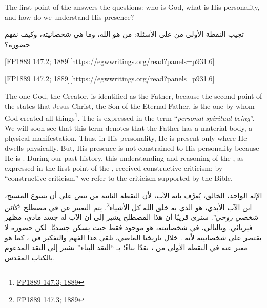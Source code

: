 



The first point of the  answers the questions: who is God, what is His personality, and how do we understand His presence?


تجيب النقطة الأولى من  على الأسئلة: من هو الله، وما هي شخصانيته، وكيف نفهم حضوره؟


[FP1889 147.2; 1889][https://egwwritings.org/read?panels=p931.6]


[FP1889 147.2; 1889][https://egwwritings.org/read?panels=p931.6]


The one God, the Creator, is identified as the Father, because the second point of the  states that Jesus Christ, the Son of the Eternal Father, is the one by whom God created all things\footnote{\href{https://egwwritings.org/?ref=en_FP1889.147.3&para=931.7}{FP1889 147.3; 1889}}. The  is expressed in the term “\textit{personal spiritual being}”. We will soon see that this term denotes that the Father has a material body, a physical manifestation. Thus, in His personality, He is present only where He dwells physically. But, His presence is not constrained to His personality because He is . During our past history, this understanding and reasoning of the , as expressed in the first point of the , received constructive criticism; by “constructive criticism” we refer to the criticism supported by the Bible.


الإله الواحد، الخالق، يُعرَّف بأنه الآب، لأن النقطة الثانية من  تنص على أن يسوع المسيح، ابن الآب الأبدي، هو الذي به خلق الله كل الأشياء\footnote{\href{https://egwwritings.org/?ref=en_FP1889.147.3&para=931.7}{FP1889 147.3; 1889}}. يتم التعبير عن  في مصطلح “\textit{كائن شخصي روحي}”. سنرى قريبًا أن هذا المصطلح يشير إلى أن الآب له جسد مادي، مظهر فيزيائي. وبالتالي، في شخصانيته، هو موجود فقط حيث يسكن جسديًا. لكن حضوره لا يقتصر على شخصانيته لأنه . خلال تاريخنا الماضي، تلقى هذا الفهم والتفكير في ، كما هو معبر عنه في النقطة الأولى من ، نقدًا بناءً؛ بـ “النقد البناء” نشير إلى النقد المدعوم بالكتاب المقدس.


